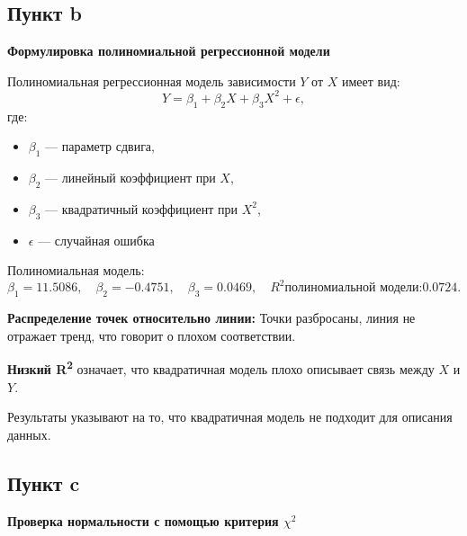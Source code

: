 \documentclass[12pt]{spbstu-task}
\begin{document}
\subsection{Пункт b}
\label{sec:orgdaca360}
\textbf{Формулировка полиномиальной регрессионной модели}

Полиномиальная регрессионная модель зависимости \(Y\) от \(X\) имеет
вид: \[Y = \beta_1 + \beta_2 X + \beta_3 X^2 + \epsilon,\] где:
\begin{itemize}
\item \(\beta_1\) --- параметр сдвига,
\item \(\beta_2\) --- линейный коэффициент при \(X\),
\item \(\beta_3\) --- квадратичный коэффициент при \(X^2\),
\item \(\epsilon\) --- случайная ошибка
\end{itemize}

\begin{figure}[H]
\centering

\end{figure}

Полиномиальная модель:
\begin{displaymath}
  \beta_1 = 11.5086,\quad
  \beta_2 = -0.4751,\quad
  \beta_3 = 0.0469,\quad
  R^2 \text{полиномиальной модели:} 0.0724.
\end{displaymath}

\textbf{Распределение точек относительно линии:} Точки разбросаны, линия не
отражает тренд, что говорит о плохом соответствии.

\textbf{Низкий R\textsuperscript{2}} означает, что квадратичная модель плохо описывает связь
между \(X\) и \(Y\).

Результаты указывают на то, что квадратичная модель не подходит для
описания данных.
\subsection{Пункт c}
\label{sec:orge3d0a2b}
\begin{figure}[H]
\centering

\end{figure}

\begin{figure}[H]
\centering

\end{figure}

\textbf{Проверка нормальности с помощью критерия \(\chi^2\)}
\end{document}
